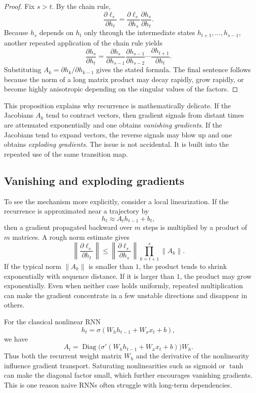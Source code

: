\begin{proof}
Fix $s>t$.
By the chain rule,
\[
\frac{\partial \ell_s}{\partial h_t}
=
\frac{\partial \ell_s}{\partial h_s}
\frac{\partial h_s}{\partial h_t}.
\]
Because $h_s$ depends on $h_t$ only through the intermediate states $h_{t+1},\dots,h_{s-1}$, another repeated application of the chain rule yields
\[
\frac{\partial h_s}{\partial h_t}
=
\frac{\partial h_s}{\partial h_{s-1}}
\frac{\partial h_{s-1}}{\partial h_{s-2}}
\cdots
\frac{\partial h_{t+1}}{\partial h_t}.
\]
Substituting $A_k = \partial h_k/\partial h_{k-1}$ gives the stated formula.
The final sentence follows because the norm of a long matrix product may decay rapidly, grow rapidly, or become highly anisotropic depending on the singular values of the factors.
\end{proof}

\medskip

This proposition explains why recurrence is mathematically delicate.
If the Jacobians $A_k$ tend to contract vectors, then gradient signals from distant times are attenuated exponentially and one obtains \emph{vanishing gradients}.
If the Jacobians tend to expand vectors, the reverse signals may blow up and one obtains \emph{exploding gradients}.
The issue is not accidental.
It is built into the repeated use of the same transition map.

\subsection*{Vanishing and exploding gradients}

To see the mechanism more explicitly, consider a local linearization.
If the recurrence is approximated near a trajectory by
\[
 h_t \approx A_t h_{t-1} + b_t,
\]
then a gradient propagated backward over $m$ steps is multiplied by a product of $m$ matrices.
A rough norm estimate gives
\[
\left\| \frac{\partial \ell_s}{\partial h_t} \right\|
\leq
\left\|\frac{\partial \ell_s}{\partial h_s}\right\|
\prod_{k=t+1}^{s} \|A_k\|.
\]
If the typical norm $\|A_k\|$ is smaller than $1$, the product tends to shrink exponentially with sequence distance.
If it is larger than $1$, the product may grow exponentially.
Even when neither case holds uniformly, repeated multiplication can make the gradient concentrate in a few unstable directions and disappear in others.

\medskip

For the classical nonlinear RNN
\[
 h_t = \sigma(W_h h_{t-1} + W_x x_t + b),
\]
we have
\[
A_t
= \operatorname{Diag}\!\bigl(\sigma'(W_h h_{t-1}+W_x x_t+b)\bigr) W_h.
\]
Thus both the recurrent weight matrix $W_h$ and the derivative of the nonlinearity influence gradient transport.
Saturating nonlinearities such as sigmoid or $\tanh$ can make the diagonal factor small, which further encourages vanishing gradients.
This is one reason naive RNNs often struggle with long-term dependencies.

